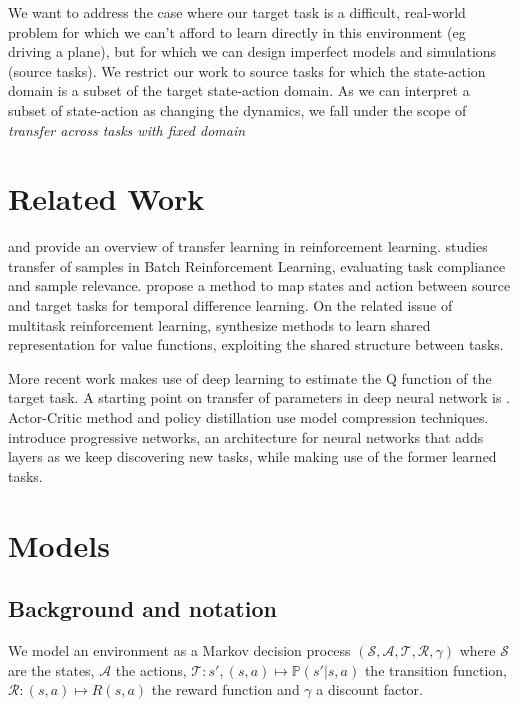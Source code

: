 \documentclass{article}
\begin{document}
We want to address the case where our target task is a difficult, real-world problem for which we can't afford to learn directly in this environment (eg driving a plane), but for which we can design imperfect models and simulations (source tasks). We restrict our work to source tasks for which the state-action domain is a subset of the target state-action domain. As we can interpret a subset of state-action as changing the dynamics, we fall under the scope of \textit{transfer across tasks with fixed domain}

\section{Related Work}

\cite{Lazaric2012} and \cite{JMLR09-taylor} provide an overview of  transfer learning in reinforcement learning. \cite{Lazaric:2008:TSB:1390156.1390225} studies transfer of samples in Batch Reinforcement Learning, evaluating task compliance and sample relevance. \cite{JMLR07-taylor} propose a method to map states and action between source and target tasks for temporal difference learning. On the related issue of multitask reinforcement learning, \cite{DBLP:journals/corr/BorsaGS16} synthesize methods to learn shared representation for value functions, exploiting the shared structure between tasks.

More recent work makes use of deep learning to estimate the Q function of the target task. A starting point on transfer of parameters in deep neural network is \cite{DBLP:journals/corr/YosinskiCBL14}. Actor-Critic method \cite{DBLP:journals/corr/ParisottoBS15} and policy distillation \cite{DBLP:journals/corr/RusuCGDKPMKH15} use model compression techniques. \cite{DBLP:journals/corr/RusuRDSKKPH16} introduce progressive networks, an architecture for neural networks that adds layers as we keep discovering new tasks, while making use of the former learned tasks.

\section{Models}

\subsection{Background and notation}
We model an environment as a Markov decision process $ (\mathcal{S}, \mathcal{A}, \mathcal{T}, \mathcal{R}, \gamma )$ where $ \mathcal{S}$ are the states, $ \mathcal{A} $ the actions, $\mathcal{T}: s', (s, a) \mapsto \mathbb{P}(s' | s, a) $ the transition function, $ \mathcal{R}: (s, a)  \mapsto R(s,a) $  the reward function and $ \gamma $ a discount factor.
\end{document}
